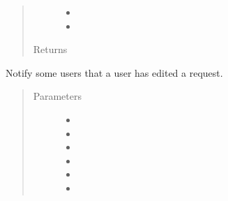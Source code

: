 \documentclass[letterpaper,10pt,english]{sphinxmanual}
\begin{document}
\begin{fulllineitems}
\begin{fulllineitems}
\begin{quote}
\begin{description}
\begin{itemize}
\item {} 
 \textendash{} 

\item {} 
 \textendash{} 

\end{itemize}

\item[{Returns}] \leavevmode


\end{description}\end{quote}

\end{fulllineitems}


\begin{fulllineitems}
\label{\detokenize{apidoc/utdesign_procurement:utdesign_procurement.emailer.EmailHandler.notifyUserEdit}}
Notify some users that a user has edited a request.
\begin{quote}\begin{description}
\item[{Parameters}] \leavevmode\begin{itemize}
\item {} 
 \textendash{} 

\item {} 
 \textendash{} 

\item {} 
 \textendash{} 

\item {} 
 \textendash{} 

\item {} 
 \textendash{} 

\item {} 
 \textendash{} 

\end{itemize}


\end{description}
\end{quote}
\end{fulllineitems}
\end{fulllineitems}
\end{document}

